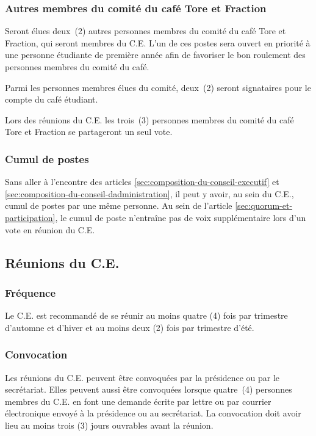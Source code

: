 \documentclass{aediroum}
\newcommand{\article}[1]{article \ref{#1}}
\begin{document}
\subsubsection{Autres membres du comité du café Tore et Fraction}\label{sec:autres-membres-du-comite-du-cafe-etudiant}

Seront élues deux~(2) autres personnes membres du comité du café Tore et Fraction, qui seront membres du C.E.
L'un de ces postes sera ouvert en priorité à une personne étudiante de première année afin de favoriser le bon roulement des personnes membres du comité du café.

Parmi les personnes membres élues du comité, deux~(2) seront signataires pour le compte du café étudiant.

Lors des réunions du C.E. les trois~(3) personnes membres du comité du café Tore et Fraction se partageront un seul vote.

\subsubsection{Cumul de postes}\label{sec:cumul-de-postes}

Sans aller à l'encontre des articles \ref{sec:composition-du-conseil-executif} et \ref{sec:composition-du-conseil-dadministration}, il peut y avoir, au sein du C.E., cumul de postes par une même personne.
Au sein de l'\article{sec:quorum-et-participation}, le cumul de poste n'entraîne pas de voix supplémentaire lors d'un vote en réunion du C.E.

\subsection{Réunions du C.E.}\label{sec:reunions-du-conseil-dadministration}

\subsubsection{Fréquence}\label{sec:frequence}

Le C.E. est recommandé de se réunir au moins quatre (4) fois par trimestre d'automne et d'hiver et au moins deux (2) fois par trimestre d'été.

\subsubsection{Convocation}\label{sec:convocation-administration}

Les réunions du C.E. peuvent être convoquées par la présidence ou par le secrétariat. Elles peuvent aussi être convoquées lorsque quatre~(4) personnes membres du C.E. en font une demande écrite par lettre ou par courrier électronique envoyé à la présidence ou au secrétariat. La convocation doit avoir lieu au moins trois (3) jours ouvrables avant la réunion.
\end{document}
